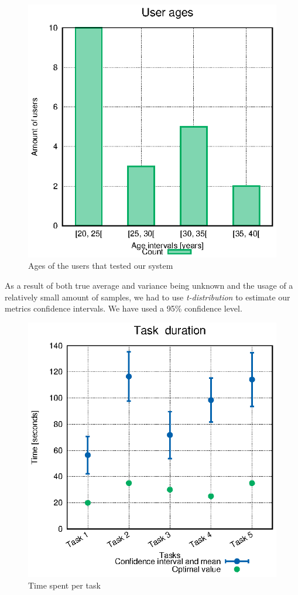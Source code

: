 \documentclass[10pt,conference]{IEEEtran}
\begin{document}
\begin{figure}
  \centering
  \includegraphics[width=0.8\linewidth]{stats/user_ages.eps}
  \caption{Ages of the users that tested our system}
  \label{fig:user_ages}
\end{figure}

As a result of both true average and variance being unknown and the usage of a relatively small amount of samples, we had to use \emph{t-distribution} to estimate our metrics confidence intervals. We have used a 95\% confidence level.

\begin{figure}
  \centering
    \includegraphics[width=0.8\linewidth]{stats/user_times.eps}
    \caption{Time spent per task}
    \label{fig:user_times}
\end{figure}
\end{document}
